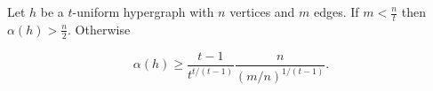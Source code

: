 \begin{theorem}\label{thm:spencer}
Let $h$ be a $t$-uniform hypergraph with $n$ vertices and $m$ edges. If
$m<\frac{n}{t}$ then $\alpha(h) > \frac{n}{2}$. Otherwise

$$
\alpha (h) \ge \frac{t-1}{t^{t/(t-1)}} \frac n{(m/n)^{1/(t-1)}}.
$$
\end{theorem}
